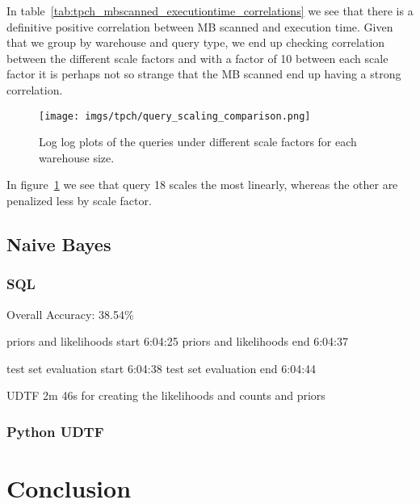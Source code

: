 \documentclass{article}
\begin{document}
In table~\ref{tab:tpch_mbscanned_executiontime_correlations} we see that there is a definitive positive correlation between MB scanned and execution time. Given that we group by warehouse and query type, we end up checking correlation between the different scale factors and with a factor of 10 between each scale factor it is perhaps not so strange that the MB scanned end up having a strong correlation. 

\medskip \noindent 

\begin{figure}[htbp]
    \centering
    \texttt{[image: imgs/tpch/query\_scaling\_comparison.png]}
    \caption{Log log plots of the queries under different scale factors for each warehouse size. }
    \label{fig:query_scaling_comp}
\end{figure}

In figure~\ref{fig:query_scaling_comp} we see that query 18 scales the most linearly, whereas the other are penalized less by scale factor. 

\FloatBarrier

\subsection{Naive Bayes}

\subsubsection{SQL}
Overall Accuracy: 38.54\%

priors and likelihoods start 	6:04:25
priors and likelihoods end 	6:04:37

test set evaluation start 	6:04:38
test set evaluation end 	6:04:44


UDTF 2m 46s for creating the likelihoods and counts and priors

\subsubsection{Python UDTF}

\section{Conclusion}

\newpage


\end{document}
